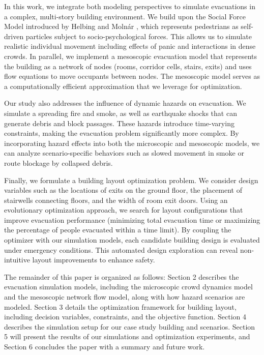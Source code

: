 \documentclass[11pt,a4paper]{article}
\begin{document}
In this work, we integrate both modeling perspectives to simulate evacuations in a complex, multi-story building environment. We build upon the Social Force Model introduced by Helbing and Moln\'ar \cite{helbing1995}, which represents pedestrians as self-driven particles subject to socio-psychological forces. This allows us to simulate realistic individual movement including effects of panic and interactions in dense crowds. In parallel, we implement a mesoscopic evacuation model that represents the building as a network of nodes (rooms, corridor cells, stairs, exits) and uses flow equations to move occupants between nodes. The mesoscopic model serves as a computationally efficient approximation that we leverage for optimization.

Our study also addresses the influence of dynamic hazards on evacuation. We simulate a spreading fire and smoke, as well as earthquake shocks that can generate debris and block passages. These hazards introduce time-varying constraints, making the evacuation problem significantly more complex. By incorporating hazard effects into both the microscopic and mesoscopic models, we can analyze scenario-specific behaviors such as slowed movement in smoke or route blockage by collapsed debris.

Finally, we formulate a building layout optimization problem. We consider design variables such as the locations of exits on the ground floor, the placement of stairwells connecting floors, and the width of room exit doors. Using an evolutionary optimization approach, we search for layout configurations that improve evacuation performance (minimizing total evacuation time or maximizing the percentage of people evacuated within a time limit). By coupling the optimizer with our simulation models, each candidate building design is evaluated under emergency conditions. This automated design exploration can reveal non-intuitive layout improvements to enhance safety. 

The remainder of this paper is organized as follows: Section 2 describes the evacuation simulation models, including the microscopic crowd dynamics model and the mesoscopic network flow model, along with how hazard scenarios are modeled. Section 3 details the optimization framework for building layout, including decision variables, constraints, and the objective function. Section 4 describes the simulation setup for our case study building and scenarios. Section 5 will present the results of our simulations and optimization experiments, and Section 6 concludes the paper with a summary and future work.
\end{document}
